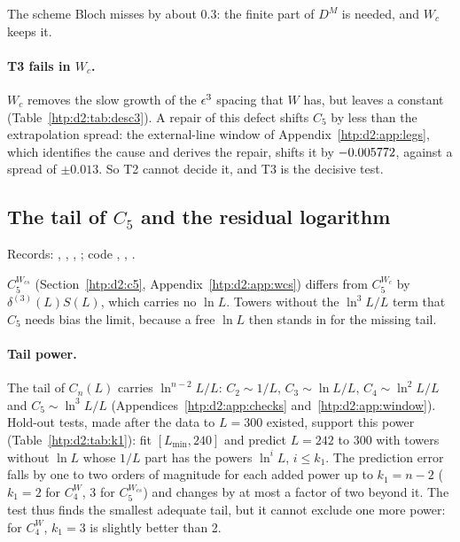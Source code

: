 The scheme Bloch misses by about $0.3$: the finite part of $D^M$ is needed, and $W_c$ keeps it.

\paragraph{T3 fails in $W_c$.} $W_c$ removes the slow growth of the $\epsilon^3$ spacing that $W$ has, but leaves a constant
(Table~\ref{htp:d2:tab:desc3}). A repair of this defect shifts $C_5$ by less than the extrapolation spread: the external-line
window of Appendix~\ref{htp:d2:app:legs}, which identifies the cause and derives the repair, shifts it by $-0.005772$, against
a spread of $\pm0.013$. So T2 cannot decide it, and T3 is the decisive test.

\subsection{The tail of \texorpdfstring{$C_5$}{C5} and the residual logarithm}\label{htp:d2:app:c5tail}
{\small\raggedright\noindent Records: ,
,
,
; code ,
, .\par}

$C_5^{W_{cs}}$ (Section~\ref{htp:d2:c5}, Appendix~\ref{htp:d2:app:wcs}) differs from $C_5^{W_c}$ by $\delta^{(3)}(L)S(L)$, which
carries no $\ln L$. Towers without the $\ln^3L/L$ term that $C_5$ needs bias the limit, because a free $\ln L$ then stands in
for the missing tail.

\paragraph{Tail power.} The tail of $C_n(L)$ carries $\ln^{n-2}L/L$: $C_2\sim1/L$, $C_3\sim\ln L/L$, $C_4\sim\ln^2L/L$ and
$C_5\sim\ln^3L/L$ (Appendices~\ref{htp:d2:app:checks} and~\ref{htp:d2:app:window}). Hold-out tests, made after the data to $L=300$ existed, support this power
(Table~\ref{htp:d2:tab:k1}): fit $[L_{\min},240]$ and predict $L=242$ to 300 with towers without $\ln L$ whose $1/L$ part has
the powers $\ln^iL$, $i\le k_1$. The prediction error falls by one to two orders of magnitude for each added power up to
$k_1=n-2$ ($k_1=2$ for $C_4^W$, 3 for $C_5^{W_{cs}}$) and changes by at most a factor of two beyond it. The test thus finds
the smallest adequate tail, but it cannot exclude one more power: for $C_4^W$, $k_1=3$ is slightly better than 2.

